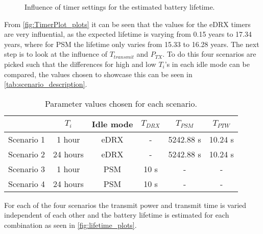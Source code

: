\begin{figure}[H]
\centering
\begin{minipage}{0.48\textwidth}
\resizebox{\textwidth}{!}{
}
\end{minipage}
\hfill
\begin{minipage}{0.48\textwidth}
\resizebox{\textwidth}{!}{
}
\end{minipage}
\caption{Influence of timer settings for the estimated battery lifetime.}
\label{fig:TimerPlot_plots}
\end{figure}

From \autoref{fig:TimerPlot_plots} it can be seen that the values for the eDRX timers are very influential, as the expected lifetime is varying from 0.15 years to 17.34 years, where for PSM the lifetime only varies from 15.33 to 16.28 years. The next step is to look at the influence of $T_{transmit}$ and $P_{TX}$. To do this four scenarios are picked such that the differences for high and low $T_i$'s in each idle mode can be compared, the values chosen to showcase this can be seen in \autoref{tab:scenario_description}.


\begin{table}[H]
\centering
\begin{tabular}{|c|c|c|c|c|c|} \hline
			& $T_i$ 		& Idle mode	& $T_{DRX}$	& $T_{PSM}$	& $T_{PTW}$	\\ \hline
Scenario 1	& 1 hour 	& eDRX 		& -			& 5242.88 s	& 10.24 s	\\ \hline
Scenario 2	& 24 hours 	& eDRX 		& -			& 5242.88 s	& 10.24 s	\\ \hline
Scenario 3	& 1 hour 	& PSM		& 10 s		& -			& -			\\ \hline
Scenario 4	& 24 hours 	& PSM		& 10 s		& -			& -			\\ \hline
\end{tabular}
\caption{Parameter values chosen for each scenario.}
\label{tab:scenario_description}
\end{table}

For each of the four scenarios the transmit power and transmit time is varied independent of each other and the battery lifetime is estimated for each combination as seen in \autoref{fig:lifetime_plots}.


